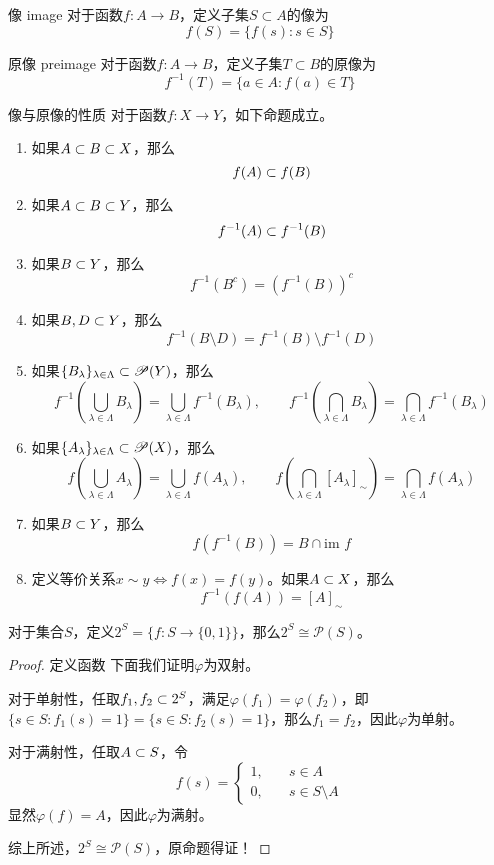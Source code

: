 \begin{definition}{像 image}
	对于函数$f:A\to B$，定义子集$S\subset A$的像为
	$$
	f(S)=\{ f(s):s\in S \}
	$$
\end{definition}

\begin{definition}{原像 preimage}
	对于函数$f:A\to B$，定义子集$T\subset B$的原像为
	$$
	f^{-1}(T)=\{ a\in A:f(a)\in T \}
	$$
\end{definition}

\begin{proposition}{像与原像的性质}
	对于函数$f:X\to Y$，如下命题成立。
	\begin{enumerate}
		\item 如果$A\subset B\subset X$，那么
		$$
		f(A)\subset f(B)
		$$
		\item 如果$A\subset B\subset Y$，那么
		$$
		f^{-1}(A)\subset f^{-1}(B)
		$$
		\item 如果$B\subset Y$，那么
		$$
		f^{-1}(B^c)=(f^{-1}(B))^c
		$$
		\item 如果$B,D\subset Y$，那么
		$$
		f^{-1}(B\setminus D)=f^{-1}(B)\setminus f^{-1}(D)
		$$
		\item 如果$\{ B_\lambda \}_{\lambda\in\Lambda}\subset\mathscr{P}(Y)$，那么
		$$
		f^{-1}\left( \bigcup_{\lambda\in\Lambda}B_\lambda \right)=\bigcup_{\lambda\in\Lambda}f^{-1}(B_\lambda),\qquad 
		f^{-1}\left( \bigcap_{\lambda\in\Lambda}B_\lambda \right)=\bigcap_{\lambda\in\Lambda}f^{-1}(B_\lambda)
		$$
		\item 如果$\{ A_\lambda \}_{\lambda\in\Lambda}\subset\mathscr{P}(X)$，那么
		$$
		f\left( \bigcup_{\lambda\in\Lambda}A_\lambda \right)=\bigcup_{\lambda\in\Lambda}f(A_\lambda),\qquad 
		f\left( \bigcap_{\lambda\in\Lambda}[A_\lambda]_\sim \right)=\bigcap_{\lambda\in\Lambda}f(A_\lambda)
		$$
		\item 如果$B\subset Y$，那么
		$$
		f(f^{-1}(B))=B\cap\text{im }f
		$$
		\item 定义等价关系$x\sim y\iff f(x)=f(y)$。如果$A\subset X$，那么
		$$
		f^{-1}(f(A))=[A]_\sim
		$$
	\end{enumerate}
\end{proposition}

\begin{proposition}
	对于集合$S$，定义$2^S=\{ f:S\to \{0,1\} \}$，那么$2^S\cong \mathscr{P}(S)$。
\end{proposition}

\begin{proof}
	定义函数
	下面我们证明$\varphi$为双射。
	
	对于单射性，任取$f_1,f_2\subset 2^S$，满足$\varphi(f_1)=\varphi(f_2)$，即$\{ s\in S:f_1(s)=1 \}=\{ s\in S:f_2(s)=1 \}$，那么$f_1=f_2$，因此$\varphi$为单射。
	
	对于满射性，任取$A\subset S$，令
	$$
	f(s)=\begin{cases}
		1,\quad & s\in A\\
		0,\quad & s\in S\setminus A
	\end{cases}
	$$
	显然$\varphi(f)=A$，因此$\varphi$为满射。
	
	综上所述，$2^S\cong \mathscr{P}(S)$，原命题得证！
\end{proof}

